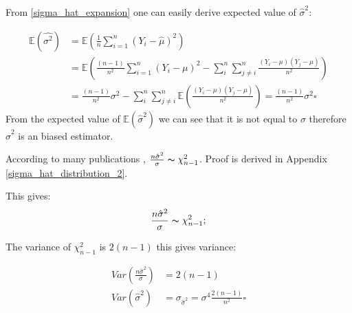 \begin{solution}
From \eqref{sigma_hat_expansion} one can easily derive expected value of $\hat{\sigma}^2$:

\begin{equation}
\begin{aligned}
\mathbb{E}(\hat{\sigma^2}) & = \mathbb{E}\left(\frac{1}{n}\sum_{i=1}^n\left(Y_i - \hat{\mu}\right)^2 \right) \\
													 & = \mathbb{E}\left(\frac{(n-1)}{n^2}\sum_{i=1}^n(Y_i - \mu)^2 
																					          - \sum_{i}^{n}\sum_{j \ne i}^{n}\frac{(Y_i -\mu)(Y_j -\mu)}{n^2} \right) \\
													 & = \frac{(n-1)}{n^2}\sigma^2 - \sum_{i}^{n}\sum_{j \ne i}^{n}\mathbb{E}\left(\frac{(Y_i -\mu)(Y_j -\mu)}{n^2}\right) 
													   = \frac{(n-1)}{n^2}\sigma^2 \square
\end{aligned}
\end{equation}
From the expected value of $\mathbb{E}(\hat{\sigma}^2)$ we can see that it is not equal to $\sigma$ therefore $\hat{\sigma}^2$ is an biased estimator.

According to many publications \cite[p.341]{Rohathi2001}\cite[p.92]{Lehman1998}\cite[p.72]{Forbes2010}, $\frac{n\hat{\sigma}^2}{\sigma} \thicksim \chi_{n-1}^2$. Proof is derived in Appendix \ref{sigma_hat_distribution_2}.

This gives: 
\begin{equation}
\frac{n\hat{\sigma}^2}{\sigma} \thicksim \chi_{n-1}^2;
\end{equation}

The variance of $\chi_{n-1}^2$ is $2(n-1)$ this gives variance:

\begin{equation}
\begin{aligned}
Var\left(\frac{n\hat{\sigma}^2}{\sigma}\right) & =  2(n-1) \\
Var\left(\hat{\sigma}^2\right) & = \sigma_{\hat{\sigma}^2} = \sigma^4\frac{2(n-1)}{n^2}\square 
\end{aligned}
\end{equation}

\end{solution}